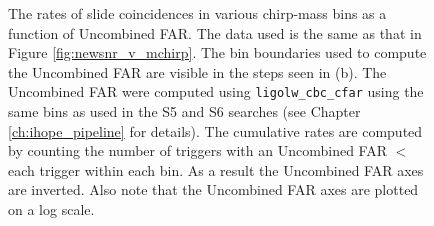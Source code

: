 \begin{figure}[p]
\begin{center}
\end{center}
\caption{The rates of slide coincidences in various chirp-mass bins as a function of Uncombined FAR. The data used is the same as that in Figure \ref{fig:newsnr_v_mchirp}. The bin boundaries used to compute the Uncombined FAR are visible in the steps seen in (b). The Uncombined FAR were computed using \texttt{ligolw\_cbc\_cfar} using the same bins as used in the S5 and S6 searches (see Chapter \ref{ch:ihope_pipeline} for details). The cumulative rates are computed by counting the number of triggers with an Uncombined FAR $<$ each trigger within each bin. As a result the Uncombined FAR axes are inverted. Also note that the Uncombined FAR axes are plotted on a log scale.}
\label{fig:ufar_v_mchirp}
\end{figure}

